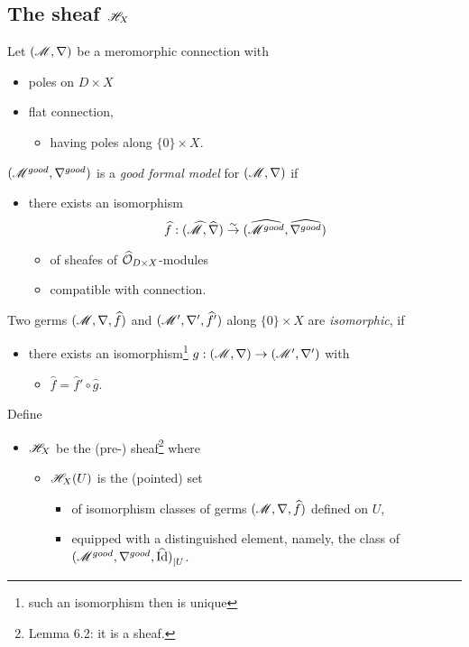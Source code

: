 \subsection{The sheaf $\mathscr{H}_X$}
\begin{defn}
  Let $(\mathscr{M},\nabla)$ be a meromorphic connection with
  \begin{itemize}
    \item poles on $D\times X$
    \item flat connection,
      \begin{itemize}
        \item having poles along $\{0\}\times X$.
      \end{itemize}
  \end{itemize}
  \begin{defn}
    $(\mathscr{M}^{good},\nabla^{good})$ is a \emph{good formal model} for
    $(\mathscr{M},\nabla)$ if
    \begin{itemize}
      \item there exists an isomorphism
        \[
          \widehat f:(\widehat{\mathscr{M}},\widehat\nabla)\overset{\sim}{\to}
          (\widehat{\mathscr{M}^{good}},\widehat{\nabla^{good}})
        \]
        \begin{itemize}
          \item of sheafes of $\widehat{\mathcal{O}}_{D\times X}$-modules
          \item compatible with connection.
        \end{itemize}
    \end{itemize}
  \end{defn}
  \begin{defn}
    Two germs $(\mathscr{M},\nabla,\widehat f)$ and $(\mathscr{M}',\nabla',\widehat f')$ along
    $\{0\}\times X$ are \emph{isomorphic}, if
    \begin{itemize}
      \item there exists an isomorphism\footnote{such an isomorphism then is
        unique} $g:(\mathscr{M},\nabla)\to(\mathscr{M}',\nabla')$ with
        \begin{itemize}
          \item $\hat f=\hat f'\circ\hat g$.
        \end{itemize}
    \end{itemize}
  \end{defn}
  Define
  \begin{itemize}
    \item $\mathscr{H}_X$ be the (pre-) sheaf\footnote{Lemma 6.2: it is a sheaf.} where
      \begin{itemize}
        \item $\mathscr{H}_X(U)$ is the (pointed) set
          \begin{itemize}
            \item of isomorphism classes of germs $(\mathscr{M},\nabla,\widehat f)$ defined
              on $U$,
        \item equipped with a distinguished element, namely, the class of
          ${(\mathscr{M}^{good},\nabla^{good},\widehat{\operatorname{Id}})}_{|U}$.
          \end{itemize}
      \end{itemize}
  \end{itemize}
\end{defn}
